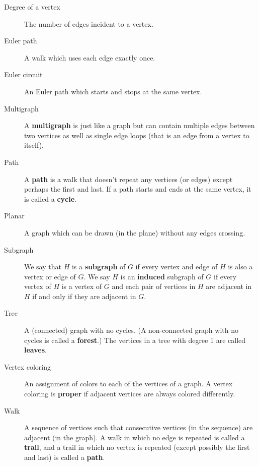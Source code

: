 \documentclass[10pt,]{book}
\newcommand{\terminology}[1]{\textbf{#1}}
\theoremstyle{plain}
\theoremstyle{definition}
\theoremstyle{definition}
\theoremstyle{definition}
\numberwithin{equation}{chapter}
\begin{document}
\begin{description}
\item[{Degree of a vertex}]\hypertarget{li-17}{}\hypertarget{p-115}{}%
 The number of edges incident to a vertex.%
\item[{Euler path}]\hypertarget{li-18}{}\hypertarget{p-116}{}%
A walk which uses each edge exactly once.%
\item[{Euler circuit}]\hypertarget{li-19}{}\hypertarget{p-117}{}%
 An Euler path which starts and stops at the same vertex.%
\item[{Multigraph}]\hypertarget{li-20}{}\hypertarget{p-118}{}%
 A \terminology{multigraph} is just like a graph but can contain multiple edges between two vertices as well as single edge loops (that is an edge from a vertex to itself).%
\item[{Path}]\hypertarget{li-21}{}\hypertarget{p-119}{}%
A \terminology{path} is a walk that doesn't repeat any vertices (or edges) except perhaps the first and last.  If a path starts and ends at the same vertex, it is called a \terminology{cycle}.%
\item[{Planar}]\hypertarget{li-22}{}\hypertarget{p-120}{}%
 A graph which can be drawn (in the plane) without any edges crossing.%
\item[{Subgraph}]\hypertarget{li-23}{}\hypertarget{p-121}{}%
 We say that \(H\) is a \terminology{subgraph} of \(G\) if every vertex and edge of \(H\) is also a vertex or edge of \(G\). We say \(H\) is an \terminology{induced} subgraph of \(G\) if every vertex of \(H\) is a vertex of \(G\) and each pair of vertices in \(H\) are adjacent in \(H\) if and only if they are adjacent in \(G\).%
\item[{Tree}]\hypertarget{li-24}{}\hypertarget{p-122}{}%
 A (connected) graph with no cycles. (A non-connected graph with no cycles is called a \terminology{forest}.) The vertices in a tree with degree 1 are called \terminology{leaves}.%
\item[{Vertex coloring}]\hypertarget{li-25}{}\hypertarget{p-123}{}%
 An assignment of colors to each of the vertices of a graph. A vertex coloring is \terminology{proper} if adjacent vertices are always colored differently.%
\item[{Walk}]\hypertarget{li-26}{}\hypertarget{p-124}{}%
 A sequence of vertices such that consecutive vertices (in the sequence) are adjacent (in the graph). A walk in which no edge is repeated is called a \terminology{trail}, and a trail in which no vertex is repeated (except possibly the first and last) is called a \terminology{path}.%
\end{description}
%
\typeout{************************************************}
\typeout{************************************************}
\end{document}
